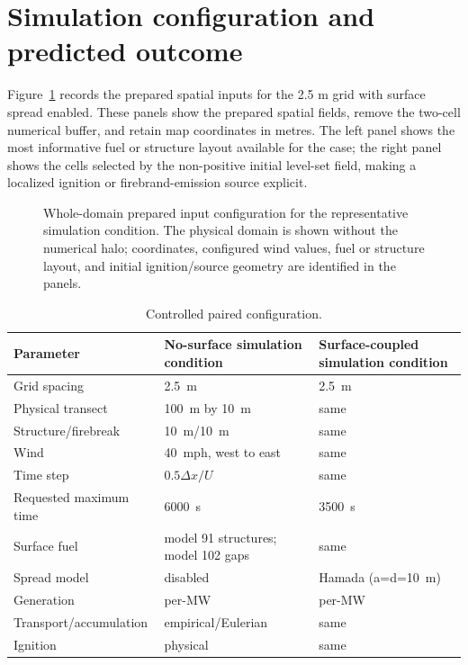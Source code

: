 \section{Simulation configuration and predicted outcome}

Figure~\ref{fig:input-configuration} records the prepared spatial inputs for the 2.5 m grid with surface spread enabled.
These panels show the prepared spatial fields, remove the
two-cell numerical buffer, and retain map coordinates in metres.  The left panel shows
the most informative fuel or structure layout available for the case; the right panel
shows the cells selected by the non-positive initial level-set field, making a localized
ignition or firebrand-emission source explicit.

\begin{figure}[H]
\centering
{}
\caption{Whole-domain prepared input configuration for the representative simulation condition.  The
physical domain is shown without the numerical halo; coordinates, configured wind values,
fuel or structure layout, and initial ignition/source geometry are identified in the panels.}
\label{fig:input-configuration}
\end{figure}

\begin{table}[H]
\centering\small
\caption{Controlled paired configuration.}
\begin{tabular}{lll}
\toprule
Parameter & No-surface simulation condition & Surface-coupled simulation condition\\
\midrule
Grid spacing & \SI{2.5}{m} & \SI{2.5}{m}\\
Physical transect & \SI{100}{m} by \SI{10}{m} & same\\
Structure/firebreak & \SI{10}{m}/\SI{10}{m} & same\\
Wind & \SI{40}{mph}, west to east & same\\
Time step & \(0.5\Delta x/U\) & same\\
Requested maximum time & \SI{6000}{s} & \SI{3500}{s}\\
Surface fuel & model 91 structures; model 102 gaps & same\\
Spread model & disabled & Hamada (a=d=\SI{10}{m})\\
Generation & per-MW & per-MW\\
Transport/accumulation & empirical/Eulerian & same\\
Ignition & physical & same\\
\bottomrule
\end{tabular}
\end{table}

